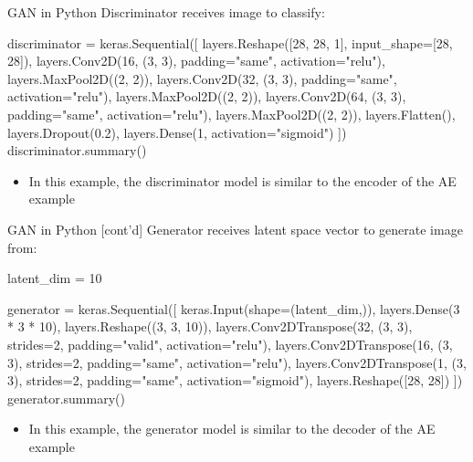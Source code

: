 \documentclass[ignorenonframetext,xcolor=x11names]{beamer}
\begin{document}
\begin{frame}[fragile]{GAN in Python}
Discriminator receives image to classify:

\begin{pythoncode}
discriminator = keras.Sequential([
    layers.Reshape([28, 28, 1], input_shape=[28, 28]),
    layers.Conv2D(16, (3, 3), 
        padding="same", activation="relu"),
    layers.MaxPool2D((2, 2)),
    layers.Conv2D(32, (3, 3), 
        padding="same", activation="relu"),
    layers.MaxPool2D((2, 2)),
    layers.Conv2D(64, (3, 3), 
        padding="same", activation="relu"),
    layers.MaxPool2D((2, 2)),
    layers.Flatten(),
    layers.Dropout(0.2),
    layers.Dense(1, activation="sigmoid")
])
discriminator.summary()
\end{pythoncode}
\begin{itemize}
   \item In this example, the discriminator model is similar to the encoder of the AE example
\end{itemize}
\end{frame}

\begin{frame}[fragile]{GAN in Python \small [cont'd]}
Generator receives latent space vector to generate image from:

\begin{pythoncode}
latent_dim = 10

generator = keras.Sequential([
    keras.Input(shape=(latent_dim,)),
    layers.Dense(3 * 3 * 10),
    layers.Reshape((3, 3, 10)),
    layers.Conv2DTranspose(32, (3, 3), strides=2, 
        padding="valid", activation="relu"),
    layers.Conv2DTranspose(16, (3, 3), strides=2, 
        padding="same", activation="relu"),
    layers.Conv2DTranspose(1, (3, 3), strides=2, 
        padding="same", activation="sigmoid"),
    layers.Reshape([28, 28])
])
generator.summary()
\end{pythoncode}
\begin{itemize}
   \item In this example, the generator model is similar to the decoder of the AE example
\end{itemize}
\end{frame}
\end{document}
